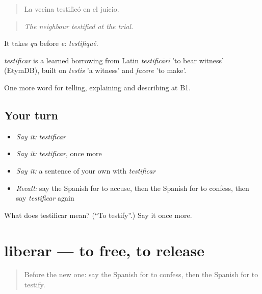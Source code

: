\begin{quote}
La vecina testificó en el juicio.
\end{quote}

\begin{quote}
\emph{The neighbour testified at the trial.}
\end{quote}

It takes \emph{qu} before \emph{e}: \emph{testifiqué}.

\begin{cousinweb}
\emph{testificar} is a learned borrowing from Latin \emph{testificārī} 'to bear witness' (EtymDB), built on \emph{testis} 'a witness' and \emph{facere} 'to make'.
\end{cousinweb}

\begin{grammarlens}[title={What you've built}]
One more word for telling, explaining and describing at B1.
\end{grammarlens}

\subsection*{Your turn}
\begin{itemize}
\raggedright
  \item \emph{Say it:} \emph{testificar}
  \item \emph{Say it:} \emph{testificar}, once more
  \item \emph{Say it:} a sentence of your own with \emph{testificar}
  \item \emph{Recall:} say the Spanish for to accuse, then the Spanish for to confess, then say \emph{testificar} again
\end{itemize}

\begin{tcolorbox}[breakable,colback=teal!4,colframe=teal!35!black,title={Before you move on}]
What does testificar mean? (\textquotedblleft{}To testify\textquotedblright{}.) Say it once more.
\end{tcolorbox}
\section[liberar]{liberar — to free, to release}

\label{lesson:ES-C523-liberar}



\begin{quote}
Before the new one: say the Spanish for to confess, then the Spanish for to testify.
\end{quote}

